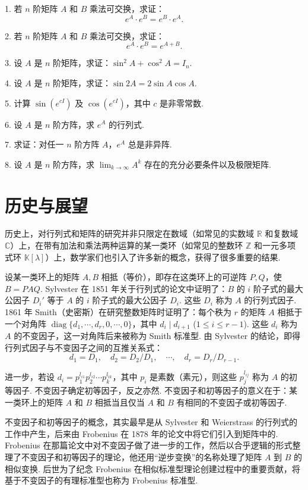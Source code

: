 \documentclass[UTF8, 12pt, fontset=fandol, oneside]{ctexart}
\begin{document}
1. 若 $n$ 阶矩阵 $A$ 和 $B$ 乘法可交换，求证：
\[
e^A\cdot e^B=e^B\cdot e^A.
\]

2. 若 $n$ 阶矩阵 $A$ 和 $B$ 乘法可交换，求证：
\[
e^A\cdot e^B=e^{A+B}.
\]

3. 设 $A$ 是 $n$ 阶矩阵，求证：$\sin^2A+\cos^2A=I_n$.

4. 设 $A$ 是 $n$ 阶矩阵，求证：$\sin2A=2\sin A\cos A$.

5. 计算 $\sin(e^{cI})$ 及 $\cos(e^{cI})$，其中 $c$ 是非零常数.

6. 设 $A$ 是 $n$ 阶方阵，求 $e^A$ 的行列式.

7. 求证：对任一 $n$ 阶方阵 $A$，$e^A$ 总是非异阵.

8. 设 $A$ 是 $n$ 阶方阵，求 $\lim_{k\to\infty}A^k$ 存在的充分必要条件以及极限矩阵.

\section*{历史与展望}

历史上，对行列式和矩阵的研究并非只限定在数域（如常见的实数域 $\mathbb R$ 和复数域 $\mathbb C$）上，在带有加法和乘法两种运算的某一类环（如常见的整数环 $\mathbb Z$ 和一元多项式环 $\mathbb K[\lambda]$）上，数学家们也引入了许多新的概念，获得了很多重要的结果.

设某一类环上的矩阵 $A,B$ 相抵（等价），即存在这类环上的可逆阵 $P,Q$，使 $B=PAQ$. Sylvester 在 1851 年关于行列式的论文中证明了：$B$ 的 $i$ 阶子式的最大公因子 $D_i'$ 等于 $A$ 的 $i$ 阶子式的最大公因子 $D_i$. 这些 $D_i$ 称为 $A$ 的行列式因子. 1861 年 Smith（史密斯）在研究整数矩阵时证明了：每个秩为 $r$ 的矩阵 $A$ 相抵于一个对角阵 $\operatorname{diag}\{d_1,\cdots,d_r,0,\cdots,0\}$，其中 $d_i\mid d_{i+1}$ ($1\leq i\leq r-1$). 这些 $d_i$ 称为 $A$ 的不变因子，这一对角阵后来被称为 Smith 标准型. 由 Sylvester 的结论，即得行列式因子与不变因子之间的互推关系式：
\[
d_1=D_1,\quad d_2=D_2/D_1,\quad \cdots,\quad d_r=D_r/D_{r-1}.
\]

进一步，若设 $d_i=p_1^{l_{i1}}p_2^{l_{i2}}\cdots p_k^{l_{ik}}$，其中 $p_i$ 是素数（素元），则这些 $p_j^{l_{ij}}$ 称为 $A$ 的初等因子. 不变因子确定初等因子，反之亦然. 不变因子和初等因子的意义在于：某一类环上的矩阵 $A$ 和 $B$ 相抵当且仅当 $A$ 和 $B$ 有相同的不变因子或初等因子.

不变因子和初等因子的概念，其实最早是从 Sylvester 和 Weierstrass 的行列式的工作中产生，后来由 Frobenius 在 1878 年的论文中将它们引入到矩阵中的. Frobenius 在那篇论文中对不变因子做了进一步的工作，然后以合乎逻辑的形式整理了不变因子和初等因子的理论，他还用“逆步变换”的名称处理了矩阵 $A$ 到 $B$ 的相似变换. 后世为了纪念 Frobenius 在相似标准型理论创建过程中的重要贡献，将基于不变因子的有理标准型也称为 Frobenius 标准型.
\end{document}
